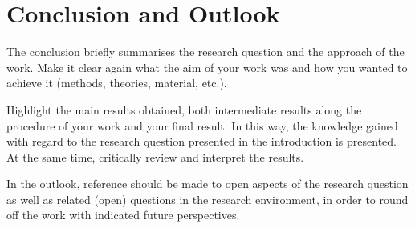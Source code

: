 \section{Conclusion and Outlook}\label{sec:conclusion}

The conclusion briefly summarises the research question and the approach of the work. Make it clear again what the aim of your work was and how you wanted to achieve it (methods, theories, material, etc.). 

Highlight the main results obtained, both intermediate results along the procedure of your work and your final result. In this way, the knowledge gained with regard to the research question presented in the introduction is presented. At the same time, critically review and interpret the results.

In the outlook, reference should be made to open aspects of the research question as well as related (open) questions in the research environment, in order to round off the work with indicated future perspectives. 
